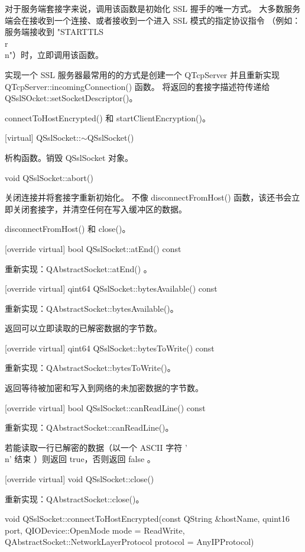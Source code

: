 对于服务端套接字来说，调用该函数是初始化 SSL 握手的唯一方式。
大多数服务端会在接收到一个连接、或者接收到一个进入 SSL 模式的指定协议指令
（例如：服务端接收到 "STARTTLS\\r\\n"）时，立即调用该函数。

实现一个 SSL 服务器最常用的的方式是创建一个 QTcpServer 并且重新实现 QTcpServer::incomingConnection() 函数。
将返回的套接字描述符传递给 QSslSOcket::setSocketDescriptor()。

\begin{seeAlso}
connectToHostEncrypted() 和 startClientEncryption()。
\end{seeAlso}

[virtual] QSslSocket::$\sim$QSslSocket()

析构函数。销毁 QSslSocket 对象。

void QSslSocket::abort()

关闭连接并将套接字重新初始化。
不像 disconnectFromHost() 函数，该还书会立即关闭套接字，并清空任何在写入缓冲区的数据。

\begin{seeAlso}
disconnectFromHost() 和 close()。
\end{seeAlso}

[override virtual] bool QSslSocket::atEnd() const

重新实现：QAbstractSocket::atEnd() 。

[override virtual] qint64 QSslSocket::bytesAvailable() const

重新实现：QAbstractSocket::bytesAvailable()。

返回可以立即读取的已解密数据的字节数。

[override virtual] qint64 QSslSocket::bytesToWrite() const

重新实现：QAbstractSocket::bytesToWrite()。

返回等待被加密和写入到网络的未加密数据的字节数。

[override virtual] bool QSslSocket::canReadLine() const

重新实现：QAbstractSocket::canReadLine()。

若能读取一行已解密的数据（以一个 ASCII 字符 '\\n' 结束 ）则返回 true，否则返回 false 。

[override virtual] void QSslSocket::close()

重新实现：QAbstractSocket::close()。

void QSslSocket::connectToHostEncrypted(const QString \&hostName, quint16 port, QIODevice::OpenMode mode = ReadWrite, QAbstractSocket::NetworkLayerProtocol protocol = AnyIPProtocol)

